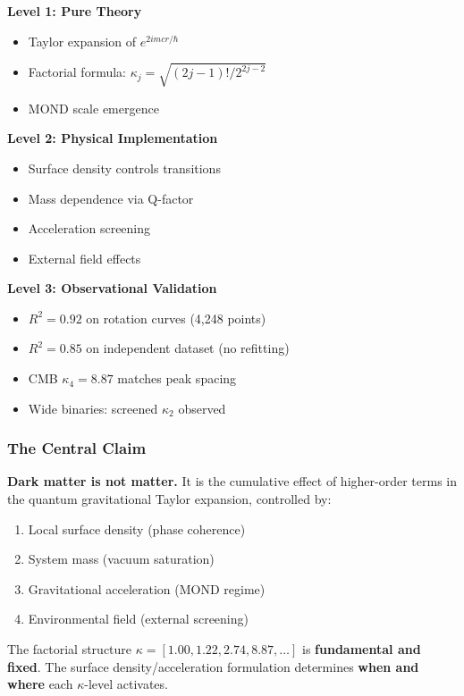 \documentclass[11pt,a4paper]{article}
\theoremstyle{definition}
\theoremstyle{remark}
\begin{document}
	\textbf{Level 1: Pure Theory}
	\begin{itemize}
		\item Taylor expansion of $e^{2imcr/\hbar}$
		\item Factorial formula: $\kappa_j = \sqrt{(2j-1)!/2^{2j-2}}$
		\item MOND scale emergence
	\end{itemize}
	
	\textbf{Level 2: Physical Implementation}
	\begin{itemize}
		\item Surface density controls transitions
		\item Mass dependence via Q-factor
		\item Acceleration screening
		\item External field effects
	\end{itemize}
	
	\textbf{Level 3: Observational Validation}
	\begin{itemize}
		\item $R^2 = 0.92$ on rotation curves (4,248 points)
		\item $R^2 = 0.85$ on independent dataset (no refitting)
		\item CMB $\kappa_4 = 8.87$ matches peak spacing
		\item Wide binaries: screened $\kappa_2$ observed
	\end{itemize}
	
	\subsubsection{The Central Claim}
	
	\textbf{Dark matter is not matter.} It is the cumulative effect of higher-order terms in the quantum gravitational Taylor expansion, controlled by:
	\begin{enumerate}
		\item Local surface density (phase coherence)
		\item System mass (vacuum saturation)
		\item Gravitational acceleration (MOND regime)
		\item Environmental field (external screening)
	\end{enumerate}
	
	The factorial structure $\kappa = [1.00, 1.22, 2.74, 8.87, \ldots]$ is \textbf{fundamental and fixed}. The surface density/acceleration formulation determines \textbf{when and where} each $\kappa$-level activates.
	
\end{document}
